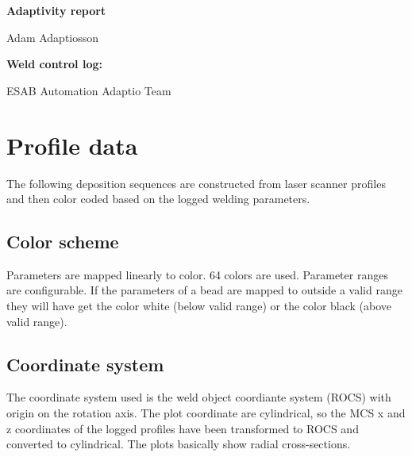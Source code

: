 \documentclass[12pt,a4paper]{report}
\begin{document}
\begin{titlepage}
    \centering

    {\Huge \textbf{Adaptivity report}\par}
    \vspace{1.5cm}
    \date{\today}

    {\Large Adam Adaptiosson\par}
    \vspace{0.5cm}

    \vfill

    \begin{center}
    \textbf{Weld control log:}\\[4pt]
    \texttt{}
    \end{center}

    \vspace{1cm}

    {\small ESAB Automation Adaptio Team}

\end{titlepage}


\newpage

\section{Profile data}
The following deposition sequences are constructed from laser scanner profiles and then color coded 
based on the logged welding parameters.

\subsection{Color scheme}
Parameters are mapped linearly to color. 64 colors are used. Parameter ranges are configurable. If the parameters of a
bead are mapped to outside a valid range they will have get the color white (below valid range) or the color black (above valid range).

\subsection{Coordinate system}
The coordinate system used is the weld object coordiante system (ROCS) with origin on the rotation axis. The plot coordinate are
cylindrical, so the MCS x and z coordinates of the logged profiles have been transformed to ROCS and converted to cylindrical. 
The plots basically show radial cross-sections.
\end{document}
